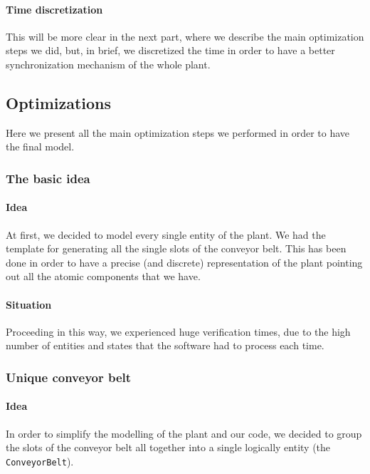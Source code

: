 \documentclass[a4paper]{article}
\begin{document}
    \paragraph{Time discretization} This will be more clear in the next part, where we describe the main optimization steps we did, but, in brief, we discretized the time in order to have a better synchronization mechanism of the whole plant.

    \pagebreak

    \subsection{Optimizations}

    Here we present all the main optimization steps we performed in order to have the final model.

    \subsubsection{The basic idea}

    \paragraph{Idea} At first, we decided to model every single entity of the plant. We had the template for generating all the single slots of the conveyor belt. This has been done in order to have a precise (and discrete) representation of the plant pointing out all the atomic components that we have.

    \paragraph{Situation} Proceeding in this way, we experienced huge verification times, due to the high number of entities and states that the software had to process each time.

    \subsubsection{Unique conveyor belt}

    \paragraph{Idea} In order to simplify the modelling of the plant and our code, we decided to group the slots of the conveyor belt all together into a single logically entity (the \texttt{ConveyorBelt}).
\end{document}
